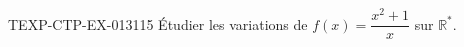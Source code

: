 \begin{exercice}{TEXP-CTP-EX-013}{1}{15}
Étudier les variations de $f(x) = \dfrac{x^2+1}{x}$ sur $\mathbb{R}^*$.

\end{exercice}
